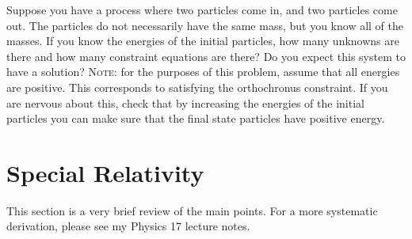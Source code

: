 \documentclass[12pt, oneside]{report}    %
\let\oldsection\section
\def\section{%
  \setcounter{sidenote}{1}%
  \oldsection
}
\begin{document}
\begin{exercise}
Suppose you have a process where two particles come in, and two particles come out. The particles do not necessarily have the same mass, but you know all of the masses. If you know the energies of the initial particles, how many unknowns are there and how many constraint equations are there? Do you expect this system to have a solution? \textsc{Note}: for the purposes of this problem, assume that all energies are positive. This corresponds to satisfying the orthochronus constraint. If you are nervous about this, check that by increasing the energies of the initial particles you can make sure that the final state particles have positive energy. 
\end{exercise}


\section{Special Relativity}

\begin{flipcomment}
This section is a very brief review of the main points. For a more systematic derivation, please see my Physics 17 lecture notes. 
\end{flipcomment}
\end{document}
